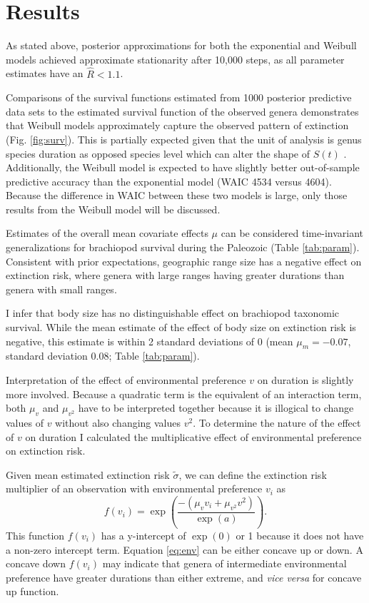 \documentclass{article}
\begin{document}
\section{Results}

As stated above, posterior approximations for both the exponential and Weibull models achieved approximate stationarity after 10,000 steps, as all parameter estimates have an \(\hat{R} < 1.1\).

Comparisons of the survival functions estimated from 1000 posterior predictive data sets to the estimated survival function of the observed genera demonstrates that Weibull models approximately capture the observed pattern of extinction (Fig. \ref{fig:surv}). This is partially expected given that the unit of analysis is genus species duration as opposed species level which can alter the shape of \(S(t)\) \citep{Raup1975,Raup1978,Raup1985,Foote2001a}. Additionally, the Weibull model is expected to have slightly better out-of-sample predictive accuracy than the exponential model (WAIC 4534 versus 4604). Because the difference in WAIC between these two models is large, only those results from the Weibull model will be discussed.

Estimates of the overall mean covariate effects \(\mu\) can be considered time-invariant generalizations for brachiopod survival during the Paleozoic (Table \ref{tab:param}). Consistent with prior expectations, geographic range size has a negative effect on extinction risk, where genera with large ranges having greater durations than genera with small ranges. 

I infer that body size has no distinguishable effect on brachiopod taxonomic survival. While the mean estimate of the effect of body size on extinction risk is negative, this estimate is within 2 standard deviations of 0 (mean \(\mu_{m} = -0.07\), standard deviation 0.08; Table \ref{tab:param}). 

Interpretation of the effect of environmental preference \(v\) on duration is slightly more involved. Because a quadratic term is the equivalent of an interaction term, both \(\mu_{v}\) and \(\mu_{v^{2}}\) have to be interpreted together because it is illogical to change values of \(v\) without also changing values \(v^{2}\). To determine the nature of the effect of \(v\) on duration I calculated the multiplicative effect of environmental preference on extinction risk.

Given mean estimated extinction risk \(\tilde{\sigma}\), we can define the extinction risk multiplier of an observation with environmental preference \(v_{i}\) as 
\begin{equation}
  f(v_{i}) = \exp\left(\frac{-(\mu_{v} v_{i} + \mu_{v^{2}} v^{2})}{\exp(a)}\right).
  \label{eq:env}
\end{equation}
This function \(f(v_{i})\) has a y-intercept of \(\exp(0)\) or 1 because it does not have a non-zero intercept term. Equation \ref{eq:env} can be either concave up or down. A concave down \(f(v_{i})\) may indicate that genera of intermediate environmental preference have greater durations than either extreme, and \textit{vice versa} for concave up function.
\end{document}
